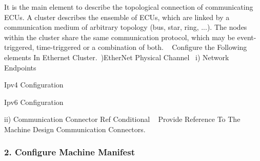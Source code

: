 It is the main element to describe the topological connection of communicating E\+C\+Us. A cluster describes the ensemble of E\+C\+Us, which are linked by a communication medium of arbitrary topology (bus, star, ring, ...). The nodes within the cluster share the same communication protocol, which may be event-\/triggered, time-\/triggered or a combination of both. ~\newline
 Configure the Following elements In Ethernet Cluster.~)Ether\+Net Physical Channel~\newline
 i) Network Endpoints
\begin{DoxyItemize}
\item Ipv4 Configuration
\item Ipv6 Configuration
\end{DoxyItemize}

ii) Communication Connector Ref Conditional ~\newline
 Provide Reference To The Machine Design Communication Connectors.



\subsubsection*{2. Configure Machine Manifest}

